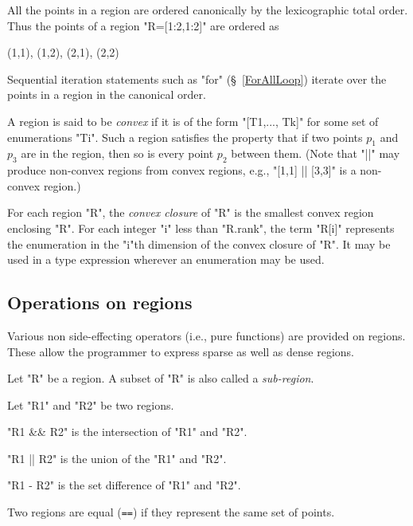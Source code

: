 All the points in a region are ordered canonically by the lexicographic total order. Thus the points of a region \xcd"R=[1:2,1:2]" are ordered as 
\begin{xten}
(1,1), (1,2), (2,1), (2,2)
\end{xten}
Sequential iteration statements such as \xcd"for" (\S~\ref{ForAllLoop})
iterate over the points in a region in the canonical order.

A region is said to be {\em convex} if it is of
the form \xcd"[T1,..., Tk]" for some set of enumerations \xcd"Ti". Such a
region satisfies the property that if two points $p_1$ and $p_3$ are
in the region, then so is every point $p_2$ between them. (Note that
\xcd"||" may produce non-convex regions from convex regions, e.g.,
\xcd"[1,1] || [3,3]" is a non-convex region.)

For each region \xcd"R", the {\em convex closure} of \xcd"R" is the
smallest convex region enclosing \xcd"R".  For each integer \xcd"i"
less than \xcd"R.rank", the term \xcd"R[i]" represents the enumeration
in the \xcd"i"th dimension of the convex closure of \xcd"R". It may be
used in a type expression wherever an enumeration may be used.

\subsection{Operations on regions}
Various non side-effecting operators (i.e., pure functions) are
provided on regions. These allow the programmer to express sparse as
well as dense regions.

Let \xcd"R" be a region. A subset of \xcd"R" is also called a {\em
sub-region}.

Let \xcd"R1" and \xcd"R2" be two regions.

\xcd"R1 && R2" is the intersection of \xcd"R1" and \xcd"R2".

\xcd"R1 || R2" is the union of the \xcd"R1" and \xcd"R2".

\xcd"R1 - R2" is the set difference of \xcd"R1" and \xcd"R2".

Two regions are equal ({\tt ==}) if they represent the same set of
points.










